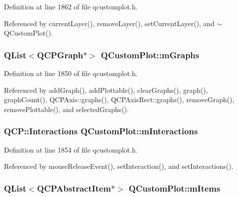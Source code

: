 Definition at line 1862 of file qcustomplot.\+h.



Referenced by current\+Layer(), remove\+Layer(), set\+Current\+Layer(), and $\sim$\+Q\+Custom\+Plot().

\hypertarget{class_q_custom_plot_adaf8d407d72a725169d7dbed2ee386bb}{}
\subsubsection[{m\+Graphs}]{\setlength{\rightskip}{0pt plus 5cm}Q\+List$<${\bf Q\+C\+P\+Graph}$\ast$$>$ Q\+Custom\+Plot\+::m\+Graphs\hspace{0.3cm}{\ttfamily [protected]}}\label{class_q_custom_plot_adaf8d407d72a725169d7dbed2ee386bb}


Definition at line 1850 of file qcustomplot.\+h.



Referenced by add\+Graph(), add\+Plottable(), clear\+Graphs(), graph(), graph\+Count(), Q\+C\+P\+Axis\+::graphs(), Q\+C\+P\+Axis\+Rect\+::graphs(), remove\+Graph(), remove\+Plottable(), and selected\+Graphs().

\hypertarget{class_q_custom_plot_ad717377ceba7493b4b32f0bcbbdf1895}{}
\subsubsection[{m\+Interactions}]{\setlength{\rightskip}{0pt plus 5cm}Q\+C\+P\+::\+Interactions Q\+Custom\+Plot\+::m\+Interactions\hspace{0.3cm}{\ttfamily [protected]}}\label{class_q_custom_plot_ad717377ceba7493b4b32f0bcbbdf1895}


Definition at line 1854 of file qcustomplot.\+h.



Referenced by mouse\+Release\+Event(), set\+Interaction(), and set\+Interactions().

\hypertarget{class_q_custom_plot_a6a93905372326e31e98d6c3bc8953ec8}{}
\subsubsection[{m\+Items}]{\setlength{\rightskip}{0pt plus 5cm}Q\+List$<${\bf Q\+C\+P\+Abstract\+Item}$\ast$$>$ Q\+Custom\+Plot\+::m\+Items\hspace{0.3cm}{\ttfamily [protected]}}\label{class_q_custom_plot_a6a93905372326e31e98d6c3bc8953ec8}


